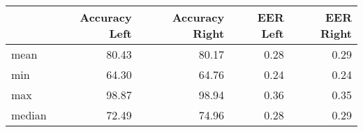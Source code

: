 \begin{tabular}{lrrrr}
\toprule
{} &  Accuracy Left &  Accuracy Right &  EER Left &  EER Right \\
\midrule
mean   &          80.43 &           80.17 &      0.28 &       0.29 \\
min    &          64.30 &           64.76 &      0.24 &       0.24 \\
max    &          98.87 &           98.94 &      0.36 &       0.35 \\
median &          72.49 &           74.96 &      0.28 &       0.29 \\
\bottomrule
\end{tabular}

